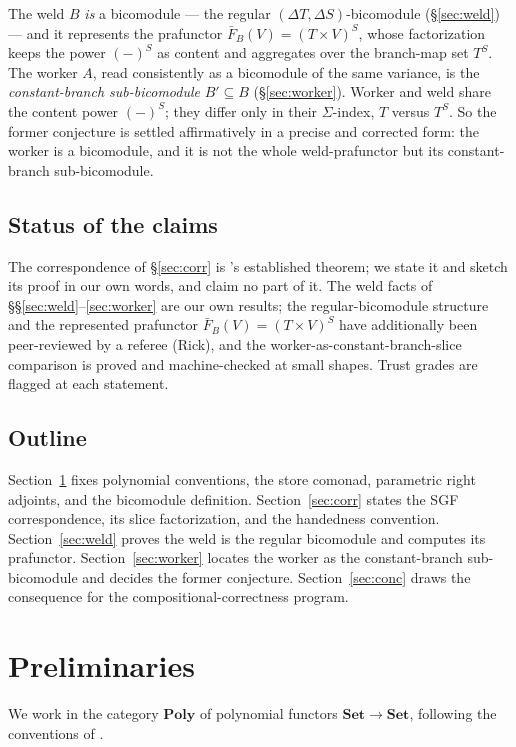 \documentclass[11pt]{amsart}
\theoremstyle{plain}
\theoremstyle{definition}
\newcommand{\Poly}{\mathbf{Poly}}
\newcommand{\Set}{\mathbf{Set}}
\newcommand{\Store}[1]{\Delta #1}
\begin{document}
The weld $B$ \emph{is} a bicomodule --- the regular $(\Store{T},\Store{S})$-bicomodule
(\S\ref{sec:weld}) --- and it represents the prafunctor $\bar F_B(V)=(T\times V)^S$, whose
factorization keeps the power $(-)^S$ as content and aggregates over the branch-map set
$T^S$. The worker $A$, read consistently as a bicomodule of the same variance, is the
\emph{constant-branch sub-bicomodule} $B'\subseteq B$ (\S\ref{sec:worker}). Worker and weld
share the content power $(-)^S$; they differ only in their $\Sigma$-index, $T$ versus $T^S$.
So the former conjecture is settled affirmatively in a precise and corrected form: the
worker is a bicomodule, and it is not the whole weld-prafunctor but its constant-branch
sub-bicomodule.

\subsection*{Status of the claims}
The correspondence of \S\ref{sec:corr} is \cite{SGF}'s established theorem; we state it and
sketch its proof in our own words, and claim no part of it. The weld facts of
\S\S\ref{sec:weld}--\ref{sec:worker} are our own results; the regular-bicomodule structure
and the represented prafunctor $\bar F_B(V)=(T\times V)^S$ have additionally been
peer-reviewed by a referee (Rick), and the worker-as-constant-branch-slice comparison is
proved and machine-checked at small shapes. Trust grades are flagged at each statement.

\subsection*{Outline}
Section~\ref{sec:prelim} fixes polynomial conventions, the store comonad, parametric right
adjoints, and the bicomodule definition. Section~\ref{sec:corr} states the SGF
correspondence, its slice factorization, and the handedness convention.
Section~\ref{sec:weld} proves the weld is the regular bicomodule and computes its
prafunctor. Section~\ref{sec:worker} locates the worker as the constant-branch
sub-bicomodule and decides the former conjecture. Section~\ref{sec:conc} draws the
consequence for the compositional-correctness program.

\section{Preliminaries}\label{sec:prelim}

We work in the category $\Poly$ of polynomial functors $\Set\to\Set$, following the
conventions of \cite{NiuSpivak}.
\end{document}
